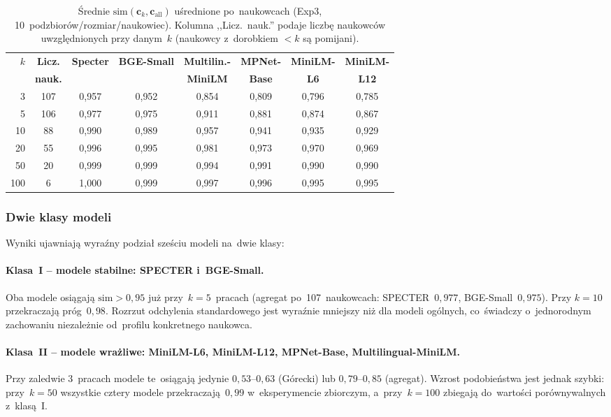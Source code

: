 \begin{table}[H]
\centering
\caption{Średnie $\mathrm{sim}(\mathbf{c}_k,\mathbf{c}_\mathrm{all})$
uśrednione po~naukowcach (Exp3, 10~podzbiorów/rozmiar/naukowiec).
Kolumna ,,Licz.\ nauk.'' podaje liczbę naukowców uwzględnionych
przy danym~$k$ (naukowcy z~dorobkiem $< k$ są pomijani).}
\label{tab:top_scientists}
\begin{tabular}{r|c|cc|cccc}
\toprule
\textbf{$k$} & \textbf{Licz.} &
\textbf{Specter} & \textbf{BGE-Small} &
\textbf{Multilin.-} & \textbf{MPNet-} & \textbf{MiniLM-} & \textbf{MiniLM-} \\
& \textbf{nauk.} & & & \textbf{MiniLM} & \textbf{Base} & \textbf{L6} & \textbf{L12} \\
\midrule
  3  & 107 & 0{,}957 & 0{,}952 & 0{,}854 & 0{,}809 & 0{,}796 & 0{,}785 \\
  5  & 106 & 0{,}977 & 0{,}975 & 0{,}911 & 0{,}881 & 0{,}874 & 0{,}867 \\
 10  &  88 & 0{,}990 & 0{,}989 & 0{,}957 & 0{,}941 & 0{,}935 & 0{,}929 \\
 20  &  55 & 0{,}996 & 0{,}995 & 0{,}981 & 0{,}973 & 0{,}970 & 0{,}969 \\
 50  &  20 & 0{,}999 & 0{,}999 & 0{,}994 & 0{,}991 & 0{,}990 & 0{,}990 \\
100  &   6 & 1{,}000 & 0{,}999 & 0{,}997 & 0{,}996 & 0{,}995 & 0{,}995 \\
\bottomrule
\end{tabular}
\end{table}

\subsubsection{Dwie klasy modeli}

Wyniki ujawniają wyraźny podział sześciu modeli na~dwie klasy:

\paragraph{Klasa~I -- modele stabilne: SPECTER i~BGE-Small.}
Oba modele osiągają $\mathrm{sim} > 0{,}95$ już przy~$k = 5$~pracach
(agregat po~107~naukowcach: SPECTER~$0{,}977$, BGE-Small~$0{,}975$).
Przy $k = 10$ przekraczają próg~$0{,}98$.
Rozrzut odchylenia standardowego jest wyraźnie mniejszy
niż dla modeli ogólnych, co~świadczy o~jednorodnym zachowaniu
niezależnie od~profilu konkretnego naukowca.

\paragraph{Klasa~II -- modele wrażliwe: MiniLM-L6, MiniLM-L12, MPNet-Base, Multilingual-MiniLM.}
Przy zaledwie 3~pracach modele te~osiągają jedynie
$0{,}53$--$0{,}63$ (Górecki) lub $0{,}79$--$0{,}85$ (agregat).
Wzrost podobieństwa jest jednak szybki: przy~$k = 50$
wszystkie cztery modele przekraczają~$0{,}99$ w~eksperymencie zbiorczym,
a~przy~$k = 100$ zbiegają do~wartości porównywalnych z~klasą~I.

